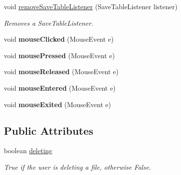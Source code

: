 \begin{DoxyCompactItemize}
void \hyperlink{classedu_1_1udel_1_1cis_1_1vsl_1_1civl_1_1gui_1_1common_1_1CIVLTable_a03a8103c2179c3956ea066bc375cfe58}{remove\+Save\+Table\+Listener} (Save\+Table\+Listener listener)
\begin{DoxyCompactList}\small\item\em Removes a Save\+Table\+Listener. \end{DoxyCompactList}\item 
\hypertarget{classedu_1_1udel_1_1cis_1_1vsl_1_1civl_1_1gui_1_1common_1_1CIVLTable_ada0e8292a9e9ec4d94ecd97e1f9fe1fd}{}void {\bfseries mouse\+Clicked} (Mouse\+Event e)\label{classedu_1_1udel_1_1cis_1_1vsl_1_1civl_1_1gui_1_1common_1_1CIVLTable_ada0e8292a9e9ec4d94ecd97e1f9fe1fd}

\item 
\hypertarget{classedu_1_1udel_1_1cis_1_1vsl_1_1civl_1_1gui_1_1common_1_1CIVLTable_a406a32c9f4f80d32f43455f9d1e0e41d}{}void {\bfseries mouse\+Pressed} (Mouse\+Event e)\label{classedu_1_1udel_1_1cis_1_1vsl_1_1civl_1_1gui_1_1common_1_1CIVLTable_a406a32c9f4f80d32f43455f9d1e0e41d}

\item 
\hypertarget{classedu_1_1udel_1_1cis_1_1vsl_1_1civl_1_1gui_1_1common_1_1CIVLTable_ac3158f537970996dd3b0a85082eaa903}{}void {\bfseries mouse\+Released} (Mouse\+Event e)\label{classedu_1_1udel_1_1cis_1_1vsl_1_1civl_1_1gui_1_1common_1_1CIVLTable_ac3158f537970996dd3b0a85082eaa903}

\item 
\hypertarget{classedu_1_1udel_1_1cis_1_1vsl_1_1civl_1_1gui_1_1common_1_1CIVLTable_a15ca66e844c252d5963e7b5d59cbf952}{}void {\bfseries mouse\+Entered} (Mouse\+Event e)\label{classedu_1_1udel_1_1cis_1_1vsl_1_1civl_1_1gui_1_1common_1_1CIVLTable_a15ca66e844c252d5963e7b5d59cbf952}

\item 
\hypertarget{classedu_1_1udel_1_1cis_1_1vsl_1_1civl_1_1gui_1_1common_1_1CIVLTable_a1ab37a831efbc850235927e0b74ae136}{}void {\bfseries mouse\+Exited} (Mouse\+Event e)\label{classedu_1_1udel_1_1cis_1_1vsl_1_1civl_1_1gui_1_1common_1_1CIVLTable_a1ab37a831efbc850235927e0b74ae136}

\end{DoxyCompactItemize}
\subsection*{Public Attributes}
\begin{DoxyCompactItemize}
\item 
\hypertarget{classedu_1_1udel_1_1cis_1_1vsl_1_1civl_1_1gui_1_1common_1_1CIVLTable_a0f27eb4fd0e966c3479f212fd964cd10}{}boolean \hyperlink{classedu_1_1udel_1_1cis_1_1vsl_1_1civl_1_1gui_1_1common_1_1CIVLTable_a0f27eb4fd0e966c3479f212fd964cd10}{deleting}\label{classedu_1_1udel_1_1cis_1_1vsl_1_1civl_1_1gui_1_1common_1_1CIVLTable_a0f27eb4fd0e966c3479f212fd964cd10}

\begin{DoxyCompactList}\small\item\em True if the user is deleting a file, otherwise False. \end{DoxyCompactList}\end{DoxyCompactItemize}
